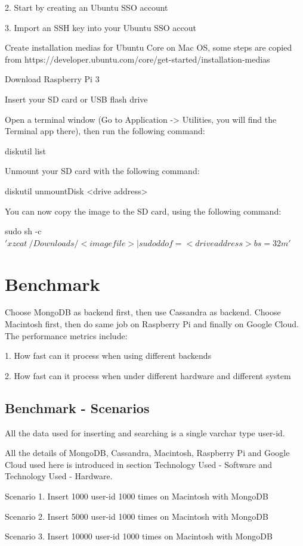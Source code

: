 2. Start by creating an Ubuntu SSO account 

3. Import an SSH key into your Ubuntu SSO accout 

Create installation medias for Ubuntu Core on Mac OS, some steps are 
copied from
https://developer.ubuntu.com/core/get-started/installation-medias

Download Raspberry Pi 3

Insert your SD card or USB flash drive

Open a terminal window (Go to Application -> Utilities, you will 
find the Terminal 
app there), then run the following command:

 diskutil list
 
 
Unmount your SD card with the following command:

diskutil unmountDisk <drive address>

You can now copy the image to the SD card, using the following command:

sudo sh -c $'xzcat ~/Downloads/<image file> | sudo dd of=<drive address> 
bs=32m'$

\section{Benchmark}
Choose MongoDB as backend first, then use Cassandra as backend. 
Choose Macintosh first, then do same job on Raspberry Pi and finally on
 Google Cloud.
The performance metrics include: 

1. How fast can it process when using different backends

2. How fast can it process when under different hardware and different system

\subsection{Benchmark - Scenarios}

All the data used for inserting and searching is a single varchar type user-id.

All the details of MongoDB,  Cassandra, Macintosh, Raspberry Pi  and 
Google Cloud used here is introduced in section Technology Used - 
Software and Technology Used - Hardware.

Scenario 1. Insert 1000 user-id 1000 times on Macintosh with MongoDB 

Scenario 2. Insert 5000 user-id 1000 times on Macintosh with MongoDB 

Scenario 3. Insert 10000 user-id 1000 times on Macintosh with MongoDB 


